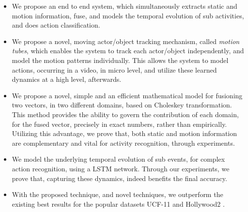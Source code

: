  \begin{itemize}
  \item We propose an end to end system, which simultaneously extracts static and motion information, fuse, and models the
temporal evolution of sub activities, and does action classification.
  \item We propose a novel, moving actor/object tracking mechanism, called \textit{motion tubes},
which enables the system to track each actor/object independently, and model the motion patterns individually.
This allows the system to model actions, occurring in a video, in micro level, and utilize these learned dynamics
at a high level, afterwards.
 \item We propose a novel, simple and an efficient mathematical model for fusioning two vectors,
in two different
domains, based on Choleskey transformation. This method provides the ability to govern the contribution of each domain,
for the fused vector, precisely in exact numbers, rather than empirically. Utilizing this advantage, we prove that,
both static and motion information are complementary and vital for activity recognition, through experiments.
  \item We model the underlying
temporal evolution of sub events, for complex action recognition, using a LSTM network. Through our experiments,
we prove that, capturing these dynamics, indeed benefits the final accuracy.
\item With the proposed technique, and novel techniques,
we outperform the existing best results for the popular datasets UCF-11 \cite{liu2009recognizing}
and Hollywood2 \cite{marszalek2009actions}.
 \end{itemize}





